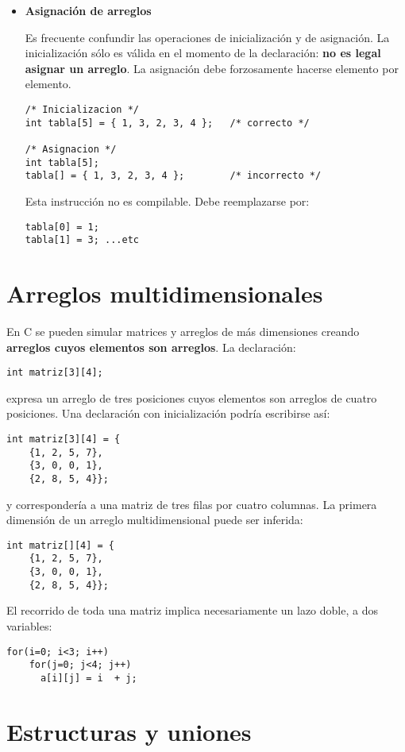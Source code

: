 \begin{itemize}
\item \textbf{Asignación de arreglos}

Es frecuente confundir las operaciones de inicialización y de asignación. La
inicialización sólo es válida en el momento de la declaración: \textbf{no es legal
asignar un arreglo}. La asignación debe forzosamente hacerse elemento por
elemento.
\begin{lstlisting}
/* Inicializacion */
int tabla[5] = { 1, 3, 2, 3, 4 }; 	/* correcto */

/* Asignacion */
int tabla[5];
tabla[] = { 1, 3, 2, 3, 4 }; 		/* incorrecto */
\end{lstlisting}
Esta instrucción no es compilable. Debe reemplazarse por:
\begin{lstlisting}
tabla[0] = 1;
tabla[1] = 3; ...etc
\end{lstlisting}
\end{itemize}

\section{Arreglos multidimensionales}
En C se pueden simular matrices y arreglos de más dimensiones creando \textbf{arreglos
cuyos elementos son arreglos}. La declaración:
\begin{lstlisting}
int matriz[3][4];
\end{lstlisting}
expresa un arreglo de tres posiciones cuyos elementos son arreglos de cuatro
posiciones. Una declaración con inicialización podría escribirse así:
\begin{lstlisting}
int matriz[3][4] = {
    {1, 2, 5, 7},
    {3, 0, 0, 1},
    {2, 8, 5, 4}};
\end{lstlisting}
y correspondería a una matriz de tres filas por cuatro columnas.
La primera dimensión de un arreglo multidimensional puede ser inferida:
\begin{lstlisting}
int matriz[][4] = {
    {1, 2, 5, 7},
    {3, 0, 0, 1},
    {2, 8, 5, 4}};
\end{lstlisting}
El recorrido de toda una matriz implica necesariamente un lazo doble, a dos
variables:
\begin{lstlisting}
for(i=0; i<3; i++)
    for(j=0; j<4; j++)
      a[i][j] = i  + j;	
\end{lstlisting}

\section{Estructuras y uniones}

